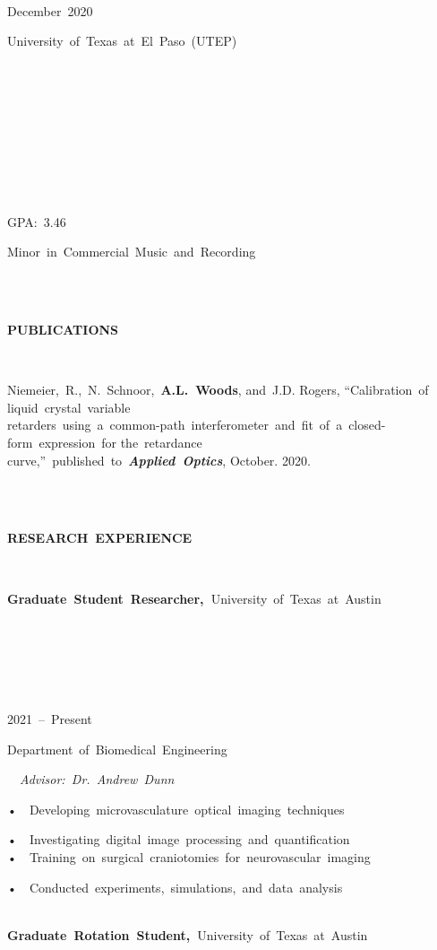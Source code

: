 \documentclass[
]{article}
\begin{document}
~

~

~

~

~

~

December~2020~

University~of~Texas~at~El~Paso~(UTEP)~~~

~

~

~

~

~

GPA:~3.46~

Minor~in~Commercial~Music~and~Recording~\\
\strut ~\\
\strut ~\\
\textbf{PUBLICATIONS~}

~

Niemeier,~R.,~N.~Schnoor,~\textbf{A.L.~Woods}, and~J.D. Rogers,
``Calibration~of liquid~crystal~variable~\\
retarders~using~a~common-path~interferometer~and~fit~of~a~closed-form~expression~for
the~retardance~\\
curve,''~published~to~\emph{\textbf{Applied~Optics}}, October. 2020.~\\
\strut ~\\
\strut ~\\
\textbf{RESEARCH~EXPERIENCE~}

~

\textbf{Graduate~Student~Researcher,~}University~of~Texas~at~Austin\textbf{~}

\textbf{~}

\textbf{~}

\textbf{~}

2021~--~Present~

Department~of~Biomedical~Engineering

~\textbar~\emph{Advisor:~Dr.~Andrew~Dunn~}

•~~Developing~microvasculature~optical~imaging~techniques~

•~~Investigating~digital~image~processing~and~quantification~\\
•~~Training~on~surgical~craniotomies~for~neurovascular~imaging~

•~~Conducted~experiments,~simulations,~and~data~analysis~

~\\
\textbf{Graduate~Rotation~Student,~}University~of~Texas~at~Austin\textbf{~}
\end{document}
